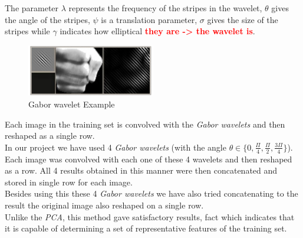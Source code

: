 \documentclass[a4paper, 11pt, twocolumn]{article}
\newcommand{\todo}[1]{\textcolor{red}{\textbf{#1}}}
\begin{document}
		The parameter $\lambda$ represents the frequency of the stripes in the wavelet, $\theta$ gives the angle of the stripes, $\psi$ is a translation parameter, $\sigma$ gives the size of the stripes while $\gamma$ indicates how elliptical  \todo{they are -> the wavelet is}.\\  
		\begin{figure}[!hbtp]
		   \centering
		   \includegraphics[width=0.5\textwidth]{gabor.png}
			\caption{Gabor wavelet Example}
	   	\end{figure}	
		\hspace*{10px}Each image in the training set is convolved with the \emph{Gabor wavelets} and then reshaped as a single row.\\
		\hspace*{10px}In our project we have used 4 \emph{Gabor wavelets} (with the angle $\theta \in \{0, \frac{\Pi}{4}, \frac{\Pi}{2}, \frac{3\Pi}{4}\}$). Each image was convolved with each one of these 4 wavelets and then reshaped as a row. All 4 results obtained in this manner were then concatenated and stored in single row for each image.\\
		\hspace*{10px}Besides using this these 4 \emph{Gabor wavelets} we have also tried concatenating to the result the original image also reshaped on a single row.\\
		\hspace*{10px}Unlike the \emph{PCA}, this method gave satisfactory results, fact which indicates that it is capable of determining a set of representative features of the training set.
\end{document}

